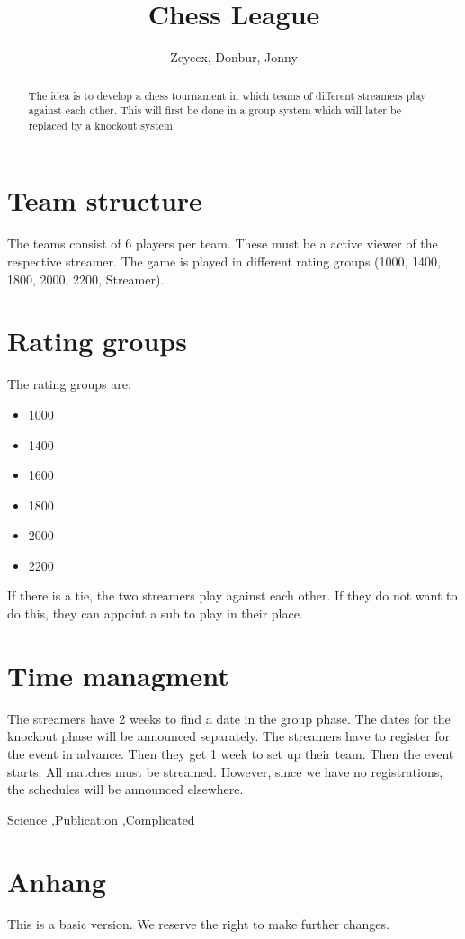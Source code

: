 \documentclass[preprint,12pt]{elsarticle}
\begin{document}
	
\begin{frontmatter}
			
\title{Chess League}
		
		
\author{Zeyecx, Donbur, Jonny}
		
\address{German Paper}
	 
\begin{abstract}
	The idea is to develop a chess tournament in which teams of different streamers play against each other.
	This will first be done in a group system which will later be replaced by a knockout system. 
\end{abstract}
\end{frontmatter}
\linenumbers
\section{Team structure}
The teams consist of 6 players per team. These must be a active viewer of the respective streamer. 
The game is played in different rating groups (1000, 1400, 1800, 2000, 2200, Streamer).

\section{Rating groups}

The rating groups are:
\begin{itemize}
	\item 1000
	\item 1400 
	\item 1600
	\item 1800
	\item 2000
	\item 2200
\end{itemize}
If there is a tie, the two streamers play against each other. If they do not want to do this, they can appoint a sub to play in their place.

\section{Time managment}
The streamers have 2 weeks to find a date in the group phase. The dates for the knockout phase will be announced separately.
The streamers have to register for the event in advance. Then they get 1 week to set up their team.
Then the event starts.
All matches must be streamed.
However, since we have no registrations, the schedules will be announced elsewhere.
\begin{keyword}
	Science \sep Publication \sep Complicated
	
	
\end{keyword}
\section{Anhang}
This is a basic version. We reserve the right to make further changes.


\linenumbers


\end{document}
